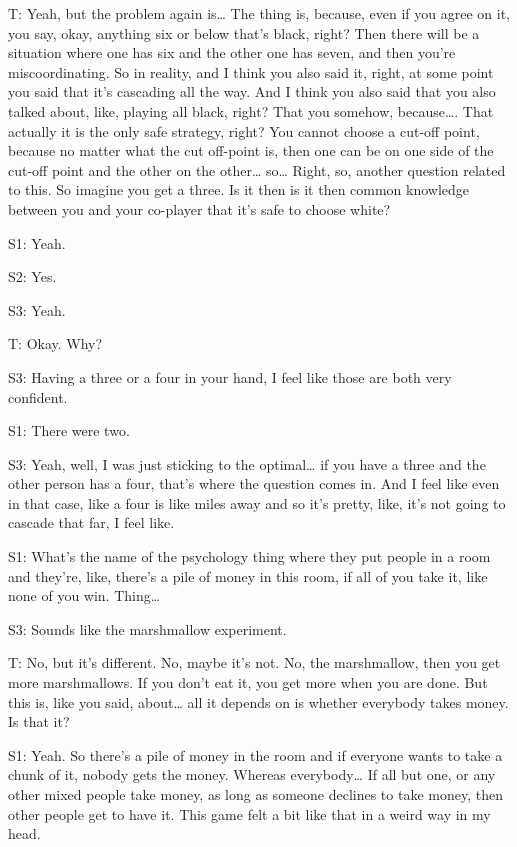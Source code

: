 T: Yeah, but the problem again is… The thing is, because, even if you agree on it, you say, okay, anything six or below that's black, right? Then there will be a situation where one has six and the other one has seven, and then you're miscoordinating. So in reality, and I think you also said it, right, at some point you said that it's cascading all the way. And I think you also said that you also talked about, like, playing all black, right? That you somehow, because…. That actually it is the only safe strategy, right? You cannot choose a cut-off point, because no matter what the cut off-point is, then one can be on one side of the cut-off point and the other on the other… so… Right, so, another question related to this. So imagine you get a three. Is it then is it then common knowledge between you and your co-player that it's safe to choose white? 

S1: Yeah. 

S2: Yes. 

S3: Yeah. 

T: Okay. Why? 

S3: Having a three or a four in your hand, I feel like those are both very confident. 

S1: There were two.

S3: Yeah, well, I was just sticking to the optimal… if you have a three and the other person has a four, that's where the question comes in. And I feel like even in that case, like a four is like miles away and so it's pretty, like, it's not going to cascade that far, I feel like.  

S1: What's the name of the psychology thing where they put people in a room and they're, like, there's a pile of money in this room, if all of you take it, like none of you win. Thing…

S3: Sounds like the marshmallow experiment. 

T: No, but it's different. No, maybe it's not. No, the marshmallow, then you get more marshmallows. If you don't eat it, you get more when you are done. But this is, like you said, about… all it depends on is whether everybody takes money. Is that it? 

S1: Yeah. So there's a pile of money in the room and if everyone wants to take a chunk of it, nobody gets the money. Whereas everybody… If all but one, or any other mixed people take money, as long as someone declines to take money, then other people get to have it. This game felt a bit like that in a weird way in my head. 

